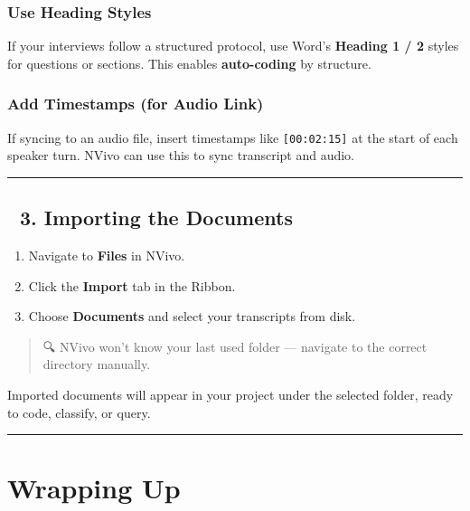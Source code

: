 \documentclass[
  letterpaper,
  DIV=11,
  numbers=noendperiod]{scrreprt}
\providecommand{\tightlist}{%
  \setlength{\itemsep}{0pt}\setlength{\parskip}{0pt}}\usepackage{longtable,booktabs,array}
\begin{document}
\subsubsection{Use Heading Styles}\label{use-heading-styles}

If your interviews follow a structured protocol, use Word's
\textbf{Heading 1 / 2} styles for questions or sections. This enables
\textbf{auto-coding} by structure.

\subsubsection{Add Timestamps (for Audio
Link)}\label{add-timestamps-for-audio-link}

If syncing to an audio file, insert timestamps like
\texttt{{[}00:02:15{]}} at the start of each speaker turn. NVivo can use
this to sync transcript and audio.

\begin{center}\rule{0.5\linewidth}{0.5pt}\end{center}

\subsection{📂 3. Importing the
Documents}\label{importing-the-documents}

\begin{enumerate}
\def\labelenumi{\arabic{enumi}.}
\tightlist
\item
  Navigate to \textbf{Files} in NVivo.
\item
  Click the \textbf{Import} tab in the Ribbon.
\item
  Choose \textbf{Documents} and select your transcripts from disk.
\end{enumerate}

\begin{quote}
🔍 NVivo won't know your last used folder --- navigate to the correct
directory manually.
\end{quote}

Imported documents will appear in your project under the selected
folder, ready to code, classify, or query.

\begin{center}\rule{0.5\linewidth}{0.5pt}\end{center}

\section{Wrapping Up}\label{wrapping-up}
\end{document}
